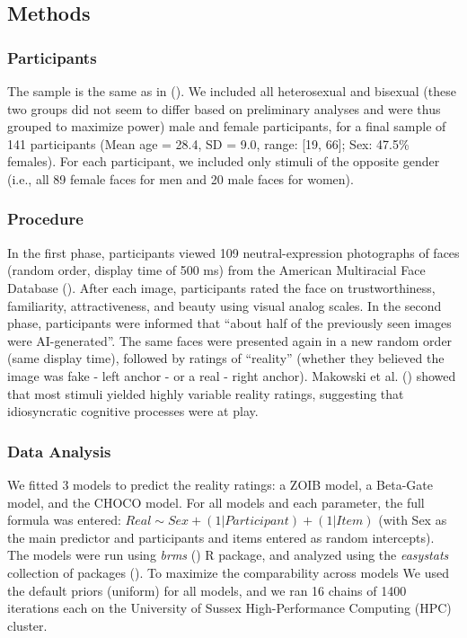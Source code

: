\documentclass[
  jou,
  floatsintext,
  longtable,
  nolmodern,
  notxfonts,
  notimes,
  colorlinks=true,linkcolor=blue,citecolor=blue,urlcolor=blue]{apa7}
\begin{document}
\subsection{Methods}\label{methods}

\subsubsection{Participants}\label{participants}

The sample is the same as in (). We included all heterosexual and bisexual (these two groups
did not seem to differ based on preliminary analyses and were thus
grouped to maximize power) male and female participants, for a final
sample of 141 participants (Mean age = 28.4, SD = 9.0, range: {[}19,
66{]}; Sex: 47.5\% females). For each participant, we included only
stimuli of the opposite gender (i.e., all 89 female faces for men and 20
male faces for women).

\subsubsection{Procedure}\label{procedure}

In the first phase, participants viewed 109 neutral-expression
photographs of faces (random order, display time of 500 ms) from the
American Multiracial Face Database
(). After each
image, participants rated the face on trustworthiness, familiarity,
attractiveness, and beauty using visual analog scales. In the second
phase, participants were informed that ``about half of the previously
seen images were AI-generated''. The same faces were presented again in
a new random order (same display time), followed by ratings of
``reality'' (whether they believed the image was fake - left anchor - or
a real - right anchor). Makowski et al.
() showed that most stimuli yielded
highly variable reality ratings, suggesting that idiosyncratic cognitive
processes were at play.

\subsubsection{Data Analysis}\label{data-analysis}

We fitted 3 models to predict the reality ratings: a ZOIB model, a
Beta-Gate model, and the CHOCO model. For all models and each parameter,
the full formula was entered:
\(Real\sim Sex + (1 | Participant) + (1 | Item)\) (with Sex as the main
predictor and participants and items entered as random intercepts). The
models were run using \emph{brms}
() R package, and analyzed
using the \emph{easystats} collection of packages
(). To maximize the
comparability across models We used the default priors (uniform) for all
models, and we ran 16 chains of 1400 iterations each on the University
of Sussex High-Performance Computing (HPC) cluster.
\end{document}
